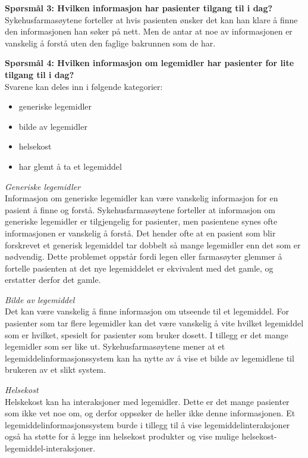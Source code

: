 \textbf{Spørsmål 3:  Hvilken informasjon har pasienter tilgang til i dag?} \\
Sykehusfarmasøytene forteller at hvis pasienten ønsker det kan han klare å finne den informasjonen han søker på nett. Men de antar at noe av informasjonen er vanskelig å forstå uten den faglige bakrunnen som de har.

\textbf{Spørsmål 4: Hvilken informasjon om legemidler har pasienter for lite tilgang til i dag?} \\
Svarene kan deles inn i følgende kategorier:
\begin{itemize}
    \item generiske legemidler
    \item bilde av legemidler
    \item helsekost
    \item har glemt å ta et legemiddel
\end{itemize}

\textit{Generiske legemidler} \\
Informasjon om generiske legemidler kan være vanskelig informasjon for en pasient å finne og forstå. Sykehusfarmasøytene forteller at informasjon om generiske legemidler er tilgjengelig for pasienter, men pasientene synes ofte informasjonen er vanskelig å forstå. Det hender ofte at en pasient som blir forskrevet et generisk legemiddel tar dobbelt så mange legemidler enn det som er nødvendig. Dette problemet oppstår fordi legen eller farmasøyter glemmer å fortelle pasienten at det nye legemiddelet er ekvivalent med det gamle, og erstatter derfor det gamle.

\textit{Bilde av legemiddel} \\
Det kan være vanskelig å finne informasjon om utseende til et legemiddel. For pasienter som tar flere legemidler kan det være vanskelig å vite hvilket legemiddel som er hvilket, spesielt for pasienter som bruker dosett. I tillegg er det mange legemidler som ser like ut. Sykehusfarmasøytene mener at et legemiddelinformasjonssystem kan ha nytte av å vise et bilde av legemidlene til brukeren av et slikt system.

\textit{Helsekost} \\
Helskekost kan ha interaksjoner med legemidler. Dette er det mange pasienter som ikke vet noe om, og derfor oppsøker de heller ikke denne informasjonen. Et legemiddelinformasjonssystem burde i tillegg til å vise legemiddelinteraksjoner også ha støtte for å legge inn helsekost produkter og vise mulige helsekost-legemiddel-interaksjoner.  

